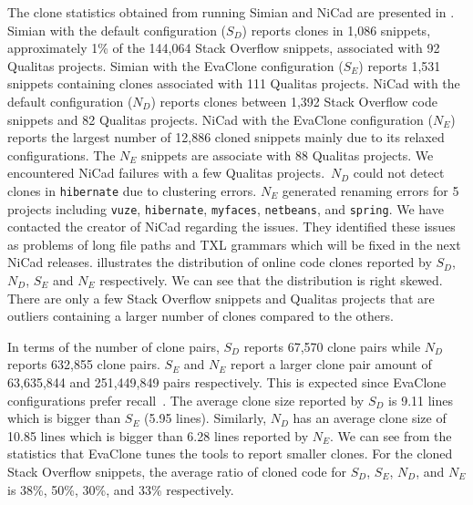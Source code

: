 \documentclass[sigconf,review, anonymous]{acmart}
\begin{document}
The clone statistics obtained from running Simian and NiCad are presented in . Simian with the default configuration ($S_D$) reports clones in 1,086 snippets, approximately 1\% of the 144,064 Stack Overflow snippets, associated with 92 Qualitas projects. Simian with the EvaClone configuration ($S_E$) reports 1,531 snippets containing clones associated with 111 Qualitas projects. NiCad with the default configuration ($N_D$) reports clones between 1,392 Stack Overflow code snippets and 82 Qualitas projects. NiCad with the EvaClone configuration ($N_E$) reports the largest number of 12,886 cloned snippets mainly due to its relaxed configurations. The $N_E$ snippets are associate with 88 Qualitas projects. We encountered NiCad failures with a few Qualitas projects.~$N_D$ could not detect clones in {\small\texttt{hibernate}} due to clustering errors. $N_E$ generated renaming errors for 5 projects including {\small\texttt{vuze}}, {\small\texttt{hibernate}}, {\small\texttt{myfaces}}, {\small\texttt{netbeans}}, and {\small\texttt{spring}}. We have contacted the creator of NiCad regarding the issues. They identified these issues as problems of long file paths and TXL grammars which will be fixed in the next NiCad releases.  illustrates the distribution of online code clones reported by $S_D$, $N_D$, $S_E$ and $N_E$ respectively. We can see that the distribution is right skewed. There are only a few Stack Overflow snippets and Qualitas projects that are outliers containing a larger number of clones compared to the others.

In terms of the number of clone pairs, $S_D$ reports 67,570 clone pairs while $N_D$ reports 632,855 clone pairs. $S_E$ and $N_E$ report a larger clone pair amount of 63,635,844 and 251,449,849 pairs respectively. This is expected since EvaClone configurations prefer recall~\cite{Wang2013}. 
The average clone size reported by $S_D$ is 9.11 lines which is bigger than $S_E$ (5.95 lines). Similarly, $N_D$ has an average clone size of 10.85 lines which is bigger than 6.28 lines reported by $N_E$. We can see from the statistics that EvaClone tunes the tools to report smaller clones. For the cloned Stack Overflow snippets, the average ratio of cloned code for $S_D$, $S_E$, $N_D$, and $N_E$ is 38\%, 50\%, 30\%, and 33\%  respectively. 
\end{document}

